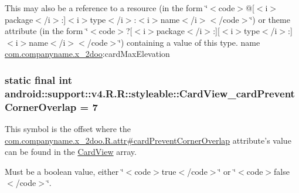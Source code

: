 This may also be a reference to a resource (in the form \char`\"{}$<$code$>$@\mbox{[}$<$i$>$package$<$/i$>$:\mbox{]}$<$i$>$type$<$/i$>$:$<$i$>$name$<$/i$>$$<$/code$>$\char`\"{}) or theme attribute (in the form \char`\"{}$<$code$>$?\mbox{[}$<$i$>$package$<$/i$>$:\mbox{]}\mbox{[}$<$i$>$type$<$/i$>$:\mbox{]}$<$i$>$name$<$/i$>$$<$/code$>$\char`\"{}) containing a value of this type.  name \hyperlink{namespacecom_1_1companyname_1_1x__2doo}{com.companyname.x\_\-2doo}:cardMaxElevation \hypertarget{classandroid_1_1support_1_1v4_1_1_r_1_1styleable_7759a07eb90cf3b5a562d36a7f68e79f}{
\subsubsection[{CardView\_\-cardPreventCornerOverlap}]{\setlength{\rightskip}{0pt plus 5cm}static final int android::support::v4.R.R::styleable::CardView\_\-cardPreventCornerOverlap = 7}}
\label{classandroid_1_1support_1_1v4_1_1_r_1_1styleable_7759a07eb90cf3b5a562d36a7f68e79f}


This symbol is the offset where the \hyperlink{classcom_1_1companyname_1_1x__2doo_1_1_r_1_1attr_a246ec9ea6bfd12fc5958b02b82bc54a}{com.companyname.x\_\-2doo.R.attr\#cardPreventCornerOverlap} attribute's value can be found in the \hyperlink{classandroid_1_1support_1_1v4_1_1_r_1_1styleable_4fcc6453aa91deadd7072add3aee5e56}{CardView} array.

Must be a boolean value, either \char`\"{}$<$code$>$true$<$/code$>$\char`\"{} or \char`\"{}$<$code$>$false$<$/code$>$\char`\"{}. 

